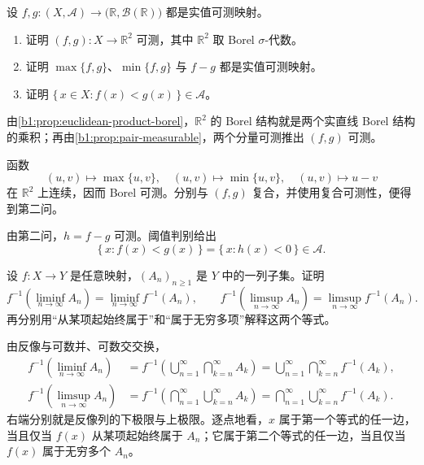\begin{exercise}
\label{b1:ex:08}
设 \(f,g:(X,\mathcal A)\to\bigl(\mathbb R,\mathcal B(\mathbb R)\bigr)\) 都是实值可测映射。
\begin{enumerate}
  \item \label{b1:item:ex08-1}
  证明 \((f,g):X\to\mathbb R^2\) 可测，其中 \(\mathbb R^2\) 取 Borel \(\sigma\)-代数。
  \item \label{b1:item:ex08-2}
  证明 \(\max\{f,g\}\)、\(\min\{f,g\}\) 与 \(f-g\) 都是实值可测映射。
  \item \label{b1:item:ex08-3}
  证明 \(\{\,x\in X:f(x)<g(x)\,\}\in\mathcal A\)。
\end{enumerate}
\end{exercise}
\begin{solution}
由\cref{b1:prop:euclidean-product-borel}，\(\mathbb R^2\) 的 Borel 结构就是两个实直线 Borel 结构的乘积；再由\cref{b1:prop:pair-measurable}，两个分量可测推出 \((f,g)\) 可测。

函数
\[
(u,v)\longmapsto\max\{u,v\},
\quad
(u,v)\longmapsto\min\{u,v\},
\quad
(u,v)\longmapsto u-v
\]
在 \(\mathbb R^2\) 上连续，因而 Borel 可测。分别与 \((f,g)\) 复合，并使用复合可测性，便得到第二问。

由第二问，\(h=f-g\) 可测。阈值判别给出
\[
\{\,x:f(x)<g(x)\,\}
=\{\,x:h(x)<0\,\}
\in\mathcal A.
\]
\end{solution}

\begin{exercise}
\label{b1:ex:09}
设 \(f:X\to Y\) 是任意映射，\((A_n)_{n\geq1}\) 是 \(Y\) 中的一列子集。证明
\[
f^{-1}\left(\liminf_{n\to\infty}A_n\right)
=\liminf_{n\to\infty}f^{-1}(A_n),
\qquad
f^{-1}\left(\limsup_{n\to\infty}A_n\right)
=\limsup_{n\to\infty}f^{-1}(A_n).
\]
再分别用“从某项起始终属于”和“属于无穷多项”解释这两个等式。
\end{exercise}
\begin{solution}
由反像与可数并、可数交交换，
\[
\begin{aligned}
f^{-1}\left(\liminf_{n\to\infty}A_n\right)
&=f^{-1}\left(\bigcup_{n=1}^{\infty}\bigcap_{k=n}^{\infty}A_k\right)
=\bigcup_{n=1}^{\infty}\bigcap_{k=n}^{\infty}f^{-1}(A_k),\\
f^{-1}\left(\limsup_{n\to\infty}A_n\right)
&=f^{-1}\left(\bigcap_{n=1}^{\infty}\bigcup_{k=n}^{\infty}A_k\right)
=\bigcap_{n=1}^{\infty}\bigcup_{k=n}^{\infty}f^{-1}(A_k).
\end{aligned}
\]
右端分别就是反像列的下极限与上极限。逐点地看，\(x\) 属于第一个等式的任一边，当且仅当 \(f(x)\) 从某项起始终属于 \(A_n\)；它属于第二个等式的任一边，当且仅当 \(f(x)\) 属于无穷多个 \(A_n\)。
\end{solution}

